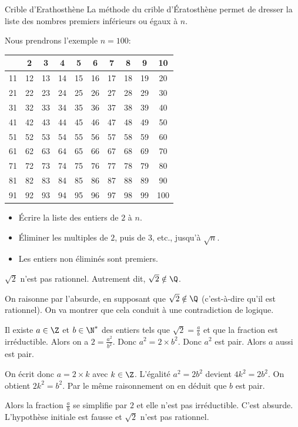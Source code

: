 \begin{methode}{Crible d'Erathosthène}{}
La méthode du crible d'Ératosthène permet de dresser la liste des nombres premiers inférieurs ou égaux à $n$. 

Nous prendrons l'exemple $n=100$:

\begin{minipage}{.6\textwidth}
  \begin{tabular}{|*{10}{c|}}
\hline
 & 2 & 3 & 4 & 5 & 6 & 7 & 8 & 9 & 10\\
\hline
11 & 12 & 13 & 14 & 15 & 16 & 17 & 18 & 19 & 20\\
\hline
21 & 22 & 23 & 24 & 25 & 26 & 27 & 28 & 29 & 30\\
\hline
31 & 32 & 33 & 34 & 35 & 36 & 37 & 38 & 39 & 40\\
\hline
41 & 42 & 43 & 44 & 45 & 46 & 47 & 48 & 49 & 50\\
\hline
51 & 52 & 53 & 54 & 55 & 56 & 57 & 58 & 59 & 60\\
\hline
61 & 62 & 63 & 64 & 65 & 66 & 67 & 68 & 69 & 70\\
\hline
71 & 72 & 73 & 74 & 75 & 76 & 77 & 78 & 79 & 80\\
\hline
81 & 82 & 83 & 84 & 85 & 86 & 87 & 88 & 89 & 90\\
\hline
91 & 92 & 93 & 94 & 95 & 96 & 97 & 98 & 99 & 100 \\
\hline
\end{tabular}
\end{minipage}
\begin{minipage}{.4\textwidth}
\begin{itemize}
  \item Écrire la liste des entiers de $2$ à $n$.
  \item Éliminer les multiples de $2$, puis de $3$, etc., jusqu'à $\sqrt{n}$.
  \item Les entiers non éliminés sont premiers.
\end{itemize}
\end{minipage}

\end{methode}


\begin{prop}{}{}
	$\sqrt{2}$ n'est pas rationnel. Autrement dit, $\sqrt{2}\notin\Q$.
\end{prop}

\begin{deme}{}{}
	On raisonne par l'absurde, en supposant que $\sqrt{2}\notin\Q$ (c'est-à-dire qu'il est rationnel). On va montrer que cela conduit à une contradiction de logique.

	Il existe $a\in\Z$ et $b\in\N^*$ des entiers tels que $\sqrt{2} = \frac{a}{b}$ et que la fraction est irréductible. Alors on a $2 = \frac{a^2}{b^2}$. Donc $a^2=2\times b^2$. Donc $a^2$ est pair. Alors $a$ aussi est pair.

	On écrit donc $a=2\times k$ avec $k\in\Z$. L'égalité $a^2=2b^2$ devient $4k^2 = 2b^2$. On obtient $2k^2=b^2$. Par le même raisonnement on en déduit que $b$ est pair.

	Alors la fraction $\frac{a}{b}$ se simplifie par $2$ et elle n'est pas irréductible. C'est absurde. L'hypothèse initiale est fausse et $\sqrt{2}$ n'est pas rationnel.
\end{deme}
